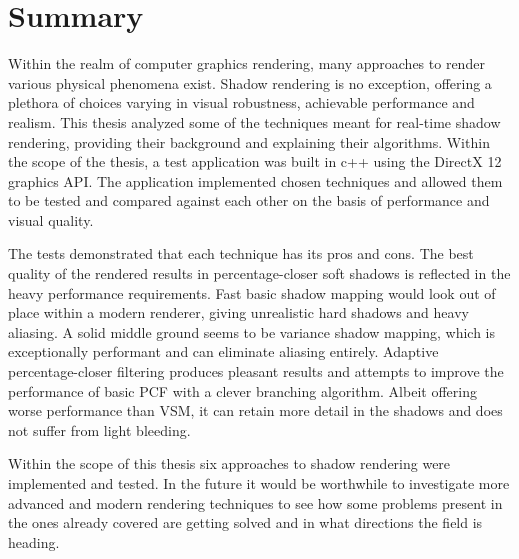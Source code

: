 \chapter{Summary}
\label{section:chapter_5}



Within the realm of computer graphics rendering, many approaches to render various physical phenomena exist. Shadow rendering is no exception, offering a plethora of choices varying in visual robustness, achievable performance and realism. This thesis analyzed some of the techniques meant for real-time shadow rendering, providing their background and explaining their algorithms. Within the scope of the thesis, a test application was built in c++ using the DirectX 12 graphics API. The application implemented chosen techniques and allowed them to be tested and compared against each other on the basis of performance and visual quality.

The tests demonstrated that each technique has its pros and cons. The best  quality of the rendered results in percentage-closer soft shadows is reflected in the heavy performance requirements. Fast basic shadow mapping would look out of place within a modern renderer, giving unrealistic hard shadows and heavy aliasing. A solid middle ground seems to be variance shadow mapping, which is exceptionally performant and can eliminate aliasing entirely. Adaptive percentage-closer filtering produces pleasant results and attempts to improve the performance of basic PCF with a clever branching algorithm. Albeit offering worse performance than VSM, it can retain more detail in the shadows and does not suffer from light bleeding.

Within the scope of this thesis six approaches to shadow rendering were implemented and tested. In the future it would be worthwhile to investigate more advanced and modern rendering techniques to see how some problems present in the ones already covered are getting solved and in what directions the field is heading.